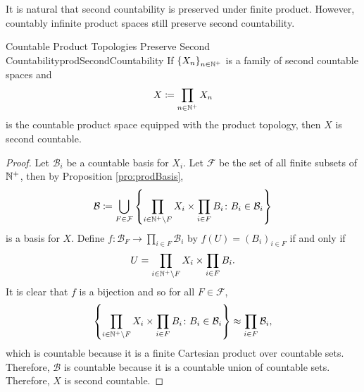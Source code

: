\documentclass[math]{amznotes}
\theoremstyle{remark}
\begin{document}
It is natural that second countability is preserved under finite product. However, countably infinite product spaces still preserve second countability.
\begin{probox}{Countable Product Topologies Preserve Second Countability}{prodSecondCountability}
    If $\left\{X_n\right\}_{n \in \mathbb{N}^+}$ is a family of second countable spaces and 
    \begin{equation*}
        X \coloneqq \prod_{n \in \mathbb{N}^+}X_n
    \end{equation*}
    is the countable product space equipped with the product topology, then $X$ is second countable.
    \tcblower
    \begin{proof}
        Let $\mathcal{B}_i$ be a countable basis for $X_i$. Let $\mathcal{F}$ be the set of all finite subsets of $\mathbb{N}^+$, then by Proposition \ref{pro:prodBasis}, 
        \begin{equation*}
            \mathcal{B} \coloneqq \bigcup_{F \in \mathcal{F}}\left\{\prod_{i \in \mathbb{N}^+ \setminus F}X_i \times \prod_{i \in F}B_i \colon B_i \in \mathcal{B}_i\right\}
        \end{equation*}
        is a basis for $X$. Define  $f \colon \mathcal{B}_F \to \prod_{i \in F}\mathcal{B}_i$ by $f\left(U\right) = \left(B_i\right)_{i \in F}$ if and only if 
        \begin{equation*}
            U = \prod_{i \in \mathbb{N}^+ \setminus F}X_i \times \prod_{i \in F}B_i.
        \end{equation*}
        It is clear that $f$ is a bijection and so for all $F \in \mathcal{F}$,
        \begin{equation*}
            \left\{\prod_{i \in \mathbb{N}^+ \setminus F}X_i \times \prod_{i \in F}B_i \colon B_i \in \mathcal{B}_i\right\} \approx \prod_{i \in F}\mathcal{B}_i,
        \end{equation*}
        which is countable because it is a finite Cartesian product over countable sets. Therefore, $\mathcal{B}$ is countable because it is a countable union of countable sets. Therefore, $X$ is second countable.
    \end{proof}
\end{probox} 
\end{document}
